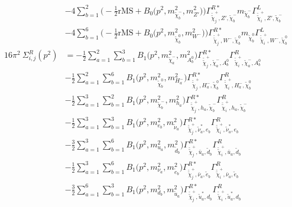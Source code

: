 \begin{itemize}
\begin{align}
 &-4 \sum_{b=1}^{2}\Big(-\frac{1}{2} \text{rMS}  + {B_0\Big(p^{2},m^2_{\tilde{\chi}^-_{{b}}},m^2_{{Z'}}\Big)}\Big){\Gamma^{R*}_{\check{\tilde{\chi}}^+_{{j}},{Z'},\tilde{\chi}^-_{{b}}}} m_{\tilde{\chi}^-_{{b}}} {\Gamma^L_{\check{\tilde{\chi}}^+_{{i}},{Z'},\tilde{\chi}^-_{{b}}}}  \nonumber \\ 
 &-4 \sum_{b=1}^{6}\Big(-\frac{1}{2} \text{rMS}  + {B_0\Big(p^{2},m^2_{\tilde{\chi}^0_{{b}}},m^2_{W^-}\Big)}\Big){\Gamma^{R*}_{\check{\tilde{\chi}}^+_{{j}},W^-,\tilde{\chi}^0_{{b}}}} m_{\tilde{\chi}^0_{{b}}} {\Gamma^L_{\check{\tilde{\chi}}^+_{{i}},W^-,\tilde{\chi}^0_{{b}}}}  \\ 
16\pi^2 \ \Sigma^R_{i,j}(p^2) &= -\frac{1}{2} \sum_{a=1}^{2}\sum_{b=1}^{3}{B_1\Big(p^{2},m^2_{\tilde{\chi}^-_{{a}}},m^2_{A^0_{{b}}}\Big)} {\Gamma^{R*}_{\check{\tilde{\chi}}^+_{{j}},\tilde{\chi}^-_{{a}},A^0_{{b}}}} {\Gamma^R_{\check{\tilde{\chi}}^+_{{i}},\tilde{\chi}^-_{{a}},A^0_{{b}}}}  \nonumber \\ 
 &-\frac{1}{2} \sum_{a=1}^{2}\sum_{b=1}^{6}{B_1\Big(p^{2},m^2_{\tilde{\chi}^0_{{b}}},m^2_{H^-_{{a}}}\Big)} {\Gamma^{R*}_{\check{\tilde{\chi}}^+_{{j}},H^-_{{a}},\tilde{\chi}^0_{{b}}}} {\Gamma^R_{\check{\tilde{\chi}}^+_{{i}},H^-_{{a}},\tilde{\chi}^0_{{b}}}}  \nonumber \\ 
 &-\frac{1}{2} \sum_{a=1}^{3}\sum_{b=1}^{2}{B_1\Big(p^{2},m^2_{\tilde{\chi}^-_{{b}}},m^2_{h_{{a}}}\Big)} {\Gamma^{R*}_{\check{\tilde{\chi}}^+_{{j}},h_{{a}},\tilde{\chi}^-_{{b}}}} {\Gamma^R_{\check{\tilde{\chi}}^+_{{i}},h_{{a}},\tilde{\chi}^-_{{b}}}}  \nonumber \\ 
 &-\frac{1}{2} \sum_{a=1}^{3}\sum_{b=1}^{3}{B_1\Big(p^{2},m^2_{e_{{b}}},m^2_{\tilde{\nu}_{{a}}}\Big)} {\Gamma^{R*}_{\check{\tilde{\chi}}^+_{{j}},\tilde{\nu}^*_{{a}},e_{{b}}}} {\Gamma^R_{\check{\tilde{\chi}}^+_{{i}},\tilde{\nu}^*_{{a}},e_{{b}}}}  \nonumber \\ 
 &-\frac{3}{2} \sum_{a=1}^{3}\sum_{b=1}^{6}{B_1\Big(p^{2},m^2_{u_{{a}}},m^2_{\tilde{d}_{{b}}}\Big)} {\Gamma^{R*}_{\check{\tilde{\chi}}^+_{{j}},\bar{u}_{{a}},\tilde{d}_{{b}}}} {\Gamma^R_{\check{\tilde{\chi}}^+_{{i}},\bar{u}_{{a}},\tilde{d}_{{b}}}}  \nonumber \\ 
 &-\frac{1}{2} \sum_{a=1}^{3}\sum_{b=1}^{6}{B_1\Big(p^{2},m^2_{\nu_{{a}}},m^2_{\tilde{e}_{{b}}}\Big)} {\Gamma^{R*}_{\check{\tilde{\chi}}^+_{{j}},\bar{\nu}_{{a}},\tilde{e}_{{b}}}} {\Gamma^R_{\check{\tilde{\chi}}^+_{{i}},\bar{\nu}_{{a}},\tilde{e}_{{b}}}}  \nonumber \\ 
 &-\frac{3}{2} \sum_{a=1}^{6}\sum_{b=1}^{3}{B_1\Big(p^{2},m^2_{d_{{b}}},m^2_{\tilde{u}_{{a}}}\Big)} {\Gamma^{R*}_{\check{\tilde{\chi}}^+_{{j}},\tilde{u}^*_{{a}},d_{{b}}}} {\Gamma^R_{\check{\tilde{\chi}}^+_{{i}},\tilde{u}^*_{{a}},d_{{b}}}}  \nonumber \\ 

\end{align}
\end{itemize}
